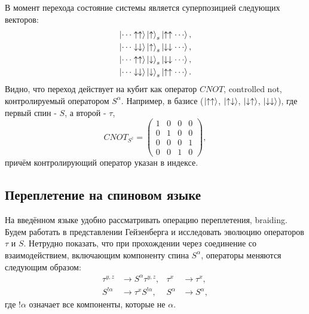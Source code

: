 \documentclass[a4paper,12pt]{article}
\theoremstyle{plain} %
\theoremstyle{definition} %
\theoremstyle{remark} %
\begin{document}
В момент перехода состояние системы является суперпозицией следующих векторов:
\begin{equation}
\begin{split}
    \ket{\dotsm \uparrow \uparrow} \ket{\uparrow}_s \ket{\uparrow \uparrow \dotsm}, \\
    \ket{\dotsm \downarrow \downarrow} \ket{\uparrow}_s \ket{\downarrow \downarrow \dotsm}, \\
    \ket{\dotsm \uparrow \uparrow} \ket{\downarrow}_s \ket{\downarrow \downarrow \dotsm}, \\
    \ket{\dotsm \downarrow \downarrow} \ket{\downarrow}_s \ket{\uparrow \uparrow \dotsm}.
\end{split}
\label{eq:transition_states}
\end{equation}
Видно, что переход действует на кубит как оператор $CNOT$, controlled not, контролируемый оператором $S^\alpha$. Например, в базисе ($\ket{\uparrow\uparrow}$, $\ket{\uparrow\downarrow}$, $\ket{\downarrow\uparrow}$, $\ket{\downarrow\downarrow}$), где первый спин - $S$, а второй - $\tau$,
\begin{equation}
CNOT_{S^z} = 
\begin{pmatrix}
    1 & 0 & 0 & 0 \\
    0 & 1 & 0 & 0 \\
    0 & 0 & 0 & 1 \\
    0 & 0 & 1 & 0
\end{pmatrix},
\end{equation}
причём контролирующий оператор указан в индексе.

\pagebreak

\subsection{Переплетение на спиновом языке} \label{sec:spin_braiding}
На введённом языке удобно рассматривать операцию переплетения, braiding. Будем работать в представлении Гейзенберга и исследовать эволюцию операторов $\tau$ и $S$. Нетрудно показать, что при прохождении через соединение со взаимодействием, включающим компоненту спина $S^\alpha$, операторы меняются следующим образом:
\begin{align}
    \tau^{y,z} &\rightarrow S^\alpha \tau^{y,z}, & \tau^x &\rightarrow \tau^x, \\
    S^{!\alpha} &\rightarrow \tau^x S^{!\alpha}, & S^\alpha &\rightarrow S^\alpha,
    \label{eq:spin_transformation}
\end{align}
где $!\alpha$ означает все компоненты, которые не $\alpha$.
\end{document}
